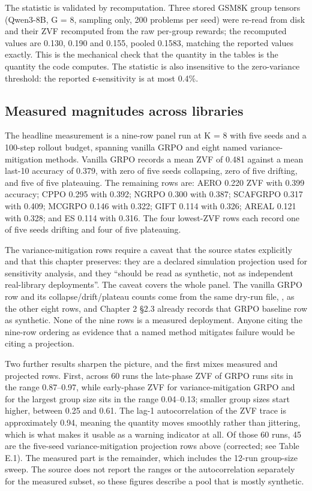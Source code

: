 \documentclass[12pt,a4paper]{report}
\newcommand{\longtok}[1]{\texttt{\seqsplit{#1}}}
\begin{document}
The statistic is validated by recomputation. Three stored GSM8K group
tensors (Qwen3-8B, G = 8, sampling only, 200 problems per seed) were
re-read from disk and their ZVF recomputed from the raw per-group
rewards; the recomputed values are 0.130, 0.190 and 0.155, pooled
0.1583, matching the reported values exactly. This is the mechanical
check that the quantity in the tables is the quantity the code computes.
The statistic is also insensitive to the zero-variance threshold: the
reported ε-sensitivity is at most 0.4\%.

\subsection{Measured magnitudes across
libraries}\label{measured-magnitudes-across-libraries}

The headline measurement is a nine-row panel run at K = 8 with five
seeds and a 100-step rollout budget, spanning vanilla GRPO and eight
named variance-mitigation methods. Vanilla GRPO records a mean ZVF of
0.481 against a mean last-10 accuracy of 0.379, with zero of five seeds
collapsing, zero of five drifting, and five of five plateauing. The
remaining rows are: AERO 0.220 ZVF with 0.399 accuracy; CPPO 0.295 with
0.392; NGRPO 0.300 with 0.387; SCAFGRPO 0.317 with 0.409; MCGRPO 0.146
with 0.322; GIFT 0.114 with 0.326; AREAL 0.121 with 0.328; and ES 0.114
with 0.316. The four lowest-ZVF rows each record one of five seeds
drifting and four of five plateauing.

The variance-mitigation rows require a caveat that the source states
explicitly and that this chapter preserves: they are a declared
simulation projection used for sensitivity analysis, and they ``should
be read as synthetic, not as independent real-library deployments''. The
caveat covers the whole panel. The vanilla GRPO row and its
collapse/drift/plateau counts come from the same dry-run file,
\longtok{experiments/results/variance\_mitigation.tsv}, as the other
eight rows, and Chapter 2 §2.3 already records that GRPO baseline row as
synthetic. None of the nine rows is a measured deployment. Anyone citing
the nine-row ordering as evidence that a named method mitigates failure
would be citing a projection.

Two further results sharpen the picture, and the first mixes measured
and projected rows. First, across 60 runs the late-phase ZVF of GRPO
runs sits in the range 0.87--0.97, while early-phase ZVF for
variance-mitigation GRPO and for the largest group size sits in the
range 0.04--0.13; smaller group sizes start higher, between 0.25 and
0.61. The lag-1 autocorrelation of the ZVF trace is approximately 0.94,
meaning the quantity moves smoothly rather than jittering, which is what
makes it usable as a warning indicator at all. Of those 60 runs, 45 are
the five-seed variance-mitigation projection rows above (corrected; see
Table E.1). The measured part is the remainder, which includes the
12-run group-size sweep. The source does not report the ranges or the
autocorrelation separately for the measured subset, so these figures
describe a pool that is mostly synthetic.
\end{document}
